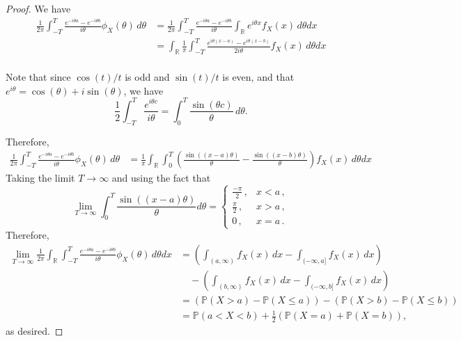 \documentclass[
  openany]{book}
\theoremstyle{definition}
\theoremstyle{definition}
\theoremstyle{definition}
\theoremstyle{definition}
\theoremstyle{remark}
\begin{document}
\begin{proof}
We have
\[\begin{aligned}
\frac{1}{2\pi} \int_{-T}^T \frac{ e^{ - i \theta a} - e^{- i \theta b}}{i\theta} \phi_X(\theta) \, d\theta
& = \frac{1}{2\pi} \int_{-T}^T \frac{ e^{ - i \theta a} - e^{- i \theta b}}{i\theta} \int_{\mathbb{R}} e^{i\theta x} f_X(x) \, d\theta dx \\
& = \int_{\mathbb{R}}\frac{1}{\pi} \int_{-T}^T \frac{ e^{ i \theta (x - a)} - e^{i \theta (x- b)}}{ 2 i\theta}  f_X(x) \, d\theta dx \\
\end{aligned}\]

Note that since \(\cos(t)/t\) is odd and \(\sin(t)/t\) is even, and that \(e^{i\theta} = \cos(\theta) + i \sin(\theta)\),
we have
\[ \frac{1}{2}\int_{-T}^T \frac{e^{i\theta c}}{i \theta} = \int_0^T \frac{\sin(\theta c)}{\theta} \, d\theta. \]

Therefore,
\[ 
\begin{aligned}
\frac{1}{2\pi} \int_{-T}^T \frac{ e^{ - i \theta a} - e^{- i \theta b}}{i\theta} \phi_X(\theta) \, d\theta
&= \frac{1}{\pi} \int_{\mathbb{R}} \int_0^T \left(  \frac{\sin((x - a)\theta)}{\theta} -  \frac{\sin((x - b)\theta)}{\theta} \right) f_X(x) \, d\theta dx
\end{aligned}
\]
Taking the limit \(T\to\infty\) and using the fact that
\[
\lim_{T \to \infty}\int_0^T \frac{\sin ((x-a)\theta)}{\theta} d\theta = 
\begin{cases}
    \frac{-\pi}{2} \,, & x < a \,,\\
    \frac{\pi}{2} \,, & x > a \,, \\
    0 \,, & x = a \,.
\end{cases}\]
Therefore,
\[ 
\begin{aligned}
\lim_{T\to \infty}\frac{1}{2\pi}
\int_{\mathbb{R}}\int_{-T}^T \frac{ e^{ - i \theta a} - e^{- i \theta b}}{i\theta} \phi_X(\theta) \, d\theta dx
&= 
\left(\int_{(a,\infty)} f_X(x) \, dx  - \int_{ (-\infty, a]} f_X(x) \, dx \right)\\
& \quad -
\left(\int_{(b,\infty)} f_X(x) \, dx  - \int_{ (-\infty, b]} f_X(x) \, dx \right) \\
&= (\mathbb{P}(X>a) - \mathbb{P}(X\leq a)) - (\mathbb{P}(X>b) - \mathbb{P}(X\leq b)) \\
&= \mathbb{P}( a < X < b) + \frac{1}{2} \left( \mathbb{P}(X = a) + \mathbb{P}(X = b)  \right),
\end{aligned} 
\]
as desired.
\end{proof}
\end{document}
